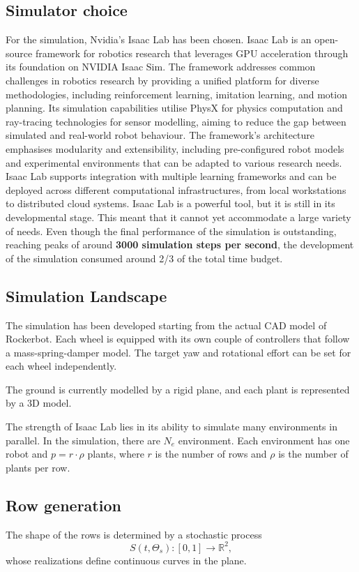 \documentclass[11pt,a4paper,twocolumn]{article}
\begin{document}
\subsection{Simulator choice}
For the simulation, Nvidia's Isaac Lab \cite{IsaacLab} has been chosen.
Isaac Lab is an open-source framework for robotics research that leverages GPU acceleration through its foundation on NVIDIA Isaac Sim. The framework addresses common challenges in robotics research by providing a unified platform for diverse methodologies, including reinforcement learning, imitation learning, and motion planning. Its simulation capabilities utilise PhysX for physics computation and ray-tracing technologies for sensor modelling, aiming to reduce the gap between simulated and real-world robot behaviour. The framework's architecture emphasises modularity and extensibility, including pre-configured robot models and experimental environments that can be adapted to various research needs. Isaac Lab supports integration with multiple learning frameworks and can be deployed across different computational infrastructures, from local workstations to distributed cloud systems.
Isaac Lab is a powerful tool, but it is still in its developmental stage. This meant that it cannot yet accommodate a large variety of needs. Even though the final performance of the simulation is outstanding, reaching peaks of around \textbf{3000 simulation steps per second}, the development of the simulation consumed around 2/3 of the total time budget.

\subsection{Simulation Landscape}
The simulation has been developed starting from the actual CAD model of Rockerbot. Each wheel is equipped with its own couple of controllers that follow a mass-spring-damper model. The target yaw and rotational effort can be set for each wheel independently.

The ground is currently modelled by a rigid plane, and each plant is represented by a 3D model.

The strength of Isaac Lab lies in its ability to simulate many environments in parallel. In the simulation, there are $N_e$ environment. Each environment has one robot and $p = r \cdot \rho$ plants, where $r$ is the number of rows and $\rho$ is the number of plants per row.

\subsection{Row generation}
The shape of the rows is determined by a stochastic process
\[
S(t, \Theta_s): [0,1] \to \mathbb{R}^2,
\]
whose realizations define continuous curves in the plane.
\end{document}

